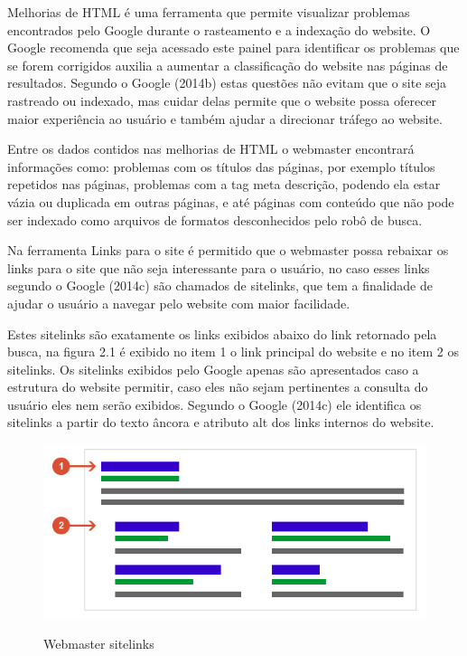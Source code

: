 \documentclass[
	12pt,				%
	openright,			%
	twoside,			%
	a4paper,			%
	english,			%
	french,				%
	spanish,			%
	brazil				%
	]{abntex2}
\begin{document}
Melhorias de HTML é  uma ferramenta que permite visualizar problemas encontrados pelo Google durante o rasteamento e a indexação do website. O Google recomenda que seja acessado este painel para identificar os problemas que se forem corrigidos auxilia a aumentar a classificação do website nas páginas de resultados. Segundo o Google (2014b) estas questões não evitam que o site seja rastreado ou indexado, mas cuidar delas permite que o website possa oferecer maior experiência ao usuário e também ajudar a direcionar tráfego ao website.

Entre os dados contidos nas melhorias de HTML o webmaster encontrará informações como: problemas com os títulos das páginas, por exemplo títulos repetidos nas páginas, problemas com a tag meta descrição, podendo ela estar vázia ou duplicada em outras páginas, e até páginas com conteúdo que não pode ser indexado como arquivos de formatos desconhecidos pelo robô de busca.

Na ferramenta Links para o site é permitido que o webmaster possa rebaixar os links para o site que não seja interessante para o usuário, no caso esses links segundo o Google (2014c) são chamados de sitelinks, que tem a finalidade de ajudar o usuário a navegar pelo website com maior facilidade.

Estes sitelinks são exatamente os links exibidos abaixo do link retornado pela busca, na figura 2.1 é exibido no item 1 o link principal do website e no item 2 os sitelinks. Os sitelinks exibidos pelo Google apenas são apresentados caso a estrutura do website permitir, caso eles não sejam pertinentes a consulta do usuário eles nem serão exibidos. Segundo o Google (2014c) ele identifica os sitelinks a partir do texto âncora e atributo alt dos links internos do website.

\begin{figure}[hbtp]
\caption{Webmaster sitelinks}
\centering
\includegraphics[totalheight=0.3\textheight]{img/webmaster-sitelinks.png}
\label{who}
\end{figure}
\end{document}
